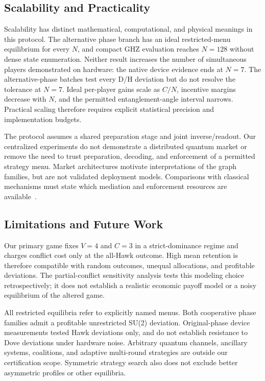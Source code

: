 \subsection{Scalability and Practicality}
Scalability has distinct mathematical, computational, and physical meanings
in this protocol. The alternative phase branch has an ideal restricted-menu
equilibrium for every $N$, and compact GHZ evaluation reaches $N=128$
without dense state enumeration. Neither result increases the number of
simultaneous players demonstrated on hardware: the native device evidence
ends at $N=7$. The alternative-phase batches test every D/H deviation
but do not resolve the tolerance at $N=7$. Ideal per-player gains
scale as $C/N$, incentive margins decrease with $N$, and the permitted
entanglement-angle interval narrows. Practical scaling therefore requires
explicit statistical precision and implementation budgets.

The protocol assumes a shared preparation stage and joint inverse/readout.
Our centralized experiments do not demonstrate a distributed quantum market
or remove the need to trust preparation, decoding, and enforcement of a
permitted strategy menu. Market architectures motivate interpretations of
the graph families, but are not validated deployment models. Comparisons
with classical mechanisms must state which mediation and enforcement
resources are available~\cite{vanenk2002classical}.

\subsection{Limitations and Future Work}
Our primary game fixes $V=4$ and $C=3$ in a strict-dominance regime and charges
conflict cost only at the all-Hawk outcome. High mean retention is therefore
compatible with random outcomes, unequal allocations, and profitable
deviations. The partial-conflict sensitivity analysis tests this modeling
choice retrospectively; it does not establish a realistic economic payoff
model or a noisy equilibrium of the altered game.

All restricted equilibria refer to explicitly named menus. Both cooperative
phase families admit a profitable unrestricted SU(2) deviation. Original-phase
device measurements tested Hawk deviations only, and do not establish
resistance to Dove deviations under hardware noise. Arbitrary quantum
channels, ancillary systems, coalitions, and adaptive multi-round strategies
are outside our certification scope. Symmetric strategy search also does not
exclude better asymmetric profiles or other equilibria.

